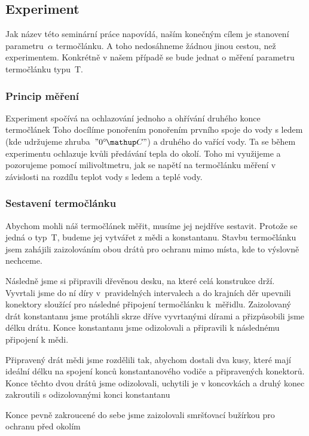 \subsection{Experiment}
Jak název této seminární práce napovídá, naším konečným cílem je stanovení
parametru~$\alpha$ termočlánku. A toho nedosáhneme žádnou jinou cestou, než
experimentem. Konkrétně v našem případě se bude jednat o měření parametru
termočlánku typu~T.

\subsubsection{Princip měření}
Experiment spočívá na ochlazování jednoho a ohřívání druhého konce termočlánek%
 Toho docílíme ponořením ponořením prvního
spoje do vody s ledem (kde udržujeme zhruba~$"0\C"$) a druhého do vařící vody.
Ta se během experimentu ochlazuje kvůli předávání tepla do okolí. Toho mi
využijeme a pozorujeme pomocí milivoltmetru, jak se napětí na termočlánku měření
v závislosti na rozdílu teplot vody s ledem a teplé vody.

\subsubsection{Sestavení termočlánku}
Abychom mohli náš termočlánek měřit, musíme jej nejdříve sestavit. Protože se
jedná o typ~T, budeme jej vytvářet z mědi a konstantanu. Stavbu termočlánku
jsem zahájili zaizolováním obou drátů pro ochranu mimo místa, kde to výslovně
nechceme.

Následně jsme si připravili dřevěnou desku, na které celá konstrukce drží.
Vyvrtali jsme do ní díry v~pravidelných intervalech a do krajních děr upevnili
konektory sloužící pro následné připojení termočlánku k~měřidlu.  Zaizolovaný
drát konstantanu jsme protáhli skrze dříve vyvrtanými dírami a přizpůsobili
jsme délku drátu. Konce konstantanu jsme odizolovali a připravili k následnému
připojení k mědi.

Připravený drát mědi jsme rozdělili tak, abychom dostali dva kusy, které mají
ideální délku na spojení konců konstantanového vodiče a připravených konektorů.
Konce těchto dvou drátů jsme odizolovali, uchytili je v koncovkách a druhý
konec zakroutili s odizolovanými konci konstantanu%

Konce pevně zakroucené do sebe jsme zaizolovali smršťovací bužírkou pro ochranu
před okolím

